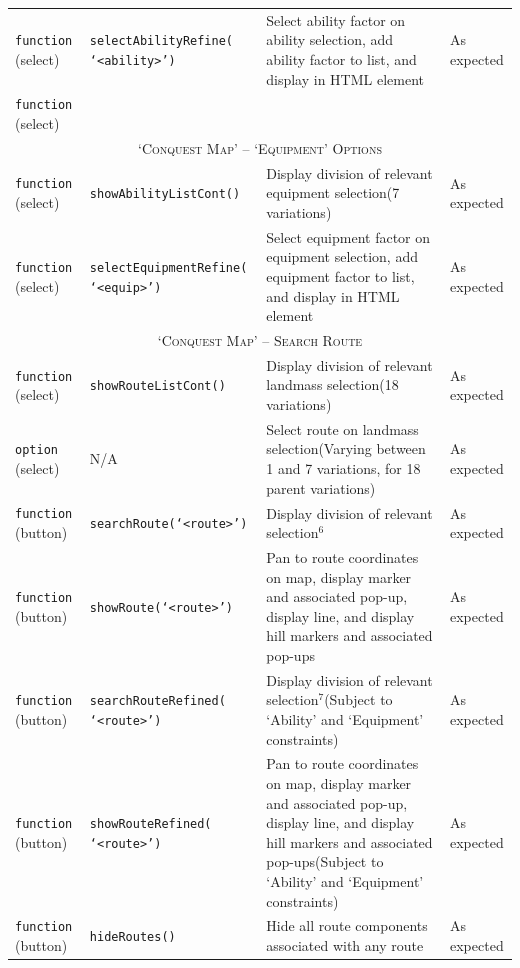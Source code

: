\documentclass[11pt, english]{article}
\begin{document}
\begin{center}
\begin{longtable}{p{2.5cm}p{3.5cm}p{5cm}p{1.75cm}}
		\texttt{function} (select) & \texttt{selectAbilityRefine( `<ability>')} & Select ability factor on ability selection, add ability factor to list, and display in HTML element & As expected\\
		\texttt{function} (select)\\
		\hline
		\multicolumn{4}{c}{\textsc{`Conquest Map' -- `Equipment' Options}}\\
		\hline
		\texttt{function} (select) & \texttt{showAbilityListCont()} & Display division of relevant equipment selection\newline (7 variations) & As expected\\
		\texttt{function} (select) & \texttt{selectEquipmentRefine( `<equip>')} & Select equipment factor on equipment selection, add equipment factor to list, and display in HTML element & As expected\\
		\hline
		\multicolumn{4}{c}{\textsc{`Conquest Map' -- Search Route}}\\
		\hline
		\texttt{function} (select) & \texttt{showRouteListCont()} & Display division of relevant landmass selection\newline (18 variations) & As expected\\
		\texttt{option} (select) & N/A & Select route on landmass selection\newline (Varying between 1 and 7 variations, for 18 parent variations) & As expected\\
		\texttt{function} (button) & \texttt{searchRoute(`<route>')} & Display division of relevant selection$^{6}$ & As expected\\
		\texttt{function} (button) & \texttt{showRoute(`<route>')} & Pan to route coordinates on map, display marker and associated pop-up, display line, and display hill markers and associated pop-ups & As expected\\
		\texttt{function} (button) & \texttt{searchRouteRefined( `<route>')} & Display division of relevant selection$^{7}$\newline (Subject to `Ability' and `Equipment' constraints) & As expected\\
		\texttt{function} (button) & \texttt{showRouteRefined( `<route>')} & Pan to route coordinates on map, display marker and associated pop-up, display line, and display hill markers and associated pop-ups\newline (Subject to `Ability' and `Equipment' constraints) & As expected\\
		\texttt{function} (button) & \texttt{hideRoutes()} & Hide all route components associated with any route & As expected\\

\end{longtable}
\end{center}
\end{document}
